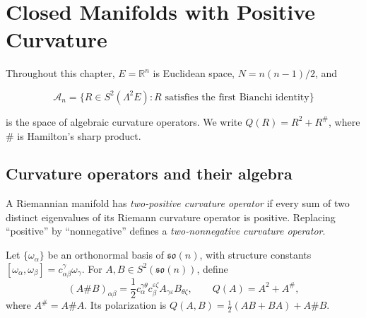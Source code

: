 \chapter[11]{Closed Manifolds with Positive Curvature}
\label{ch:chow-ii-closed-positive-curvature}

Throughout this chapter, \(E=\mathbb R^n\) is Euclidean space,
\(N=n(n-1)/2\), and

\[
  \mathcal A_n=\{R\in S^2(\Lambda^2E):R\text{ satisfies the first Bianchi identity}\}
\]

is the space of algebraic curvature operators.  We write
\(Q(R)=R^2+R^\#\), where \(\#\) is Hamilton's sharp product.

\section{Curvature operators and their algebra}

\begin{definition}
  \label{def:chow-ii-two-positive-curvature-operator}
  A Riemannian manifold has \emph{two-positive curvature operator} if every
  sum of two distinct eigenvalues of its Riemann curvature operator is
  positive.  Replacing ``positive'' by ``nonnegative'' defines a
  \emph{two-nonnegative curvature operator}.
\end{definition}

\begin{definition}
  \label{def:chow-ii-sharp-product}
  Let \(\{\omega_\alpha\}\) be an orthonormal basis of \(\mathfrak{so}(n)\),
  with structure constants
  \([\omega_\alpha,\omega_\beta]=c_{\alpha\beta}^{\gamma}\omega_\gamma\).
  For \(A,B\in S^2(\mathfrak{so}(n))\), define
  \[
    (A\#B)_{\alpha\beta}
      =\frac12c_{\alpha}^{\gamma\theta}c_{\beta}^{\varepsilon\zeta}
        A_{\gamma\varepsilon}B_{\theta\zeta},
    \qquad Q(A)=A^2+A^\#,
  \]
  where \(A^\#=A\#A\).  Its polarization is
  \(Q(A,B)=\tfrac12(AB+BA)+A\#B\).
\end{definition}

